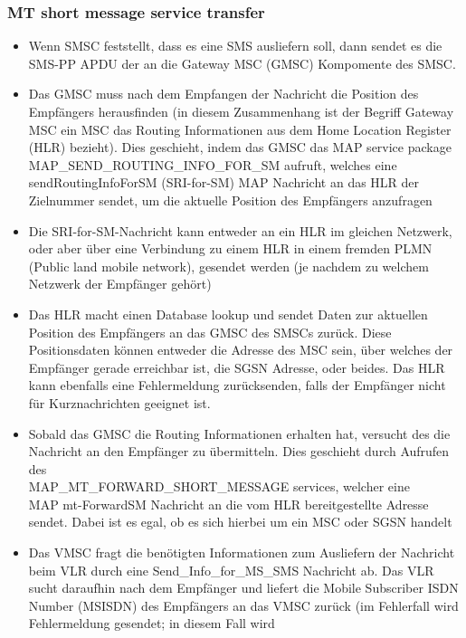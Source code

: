 \documentclass[german,12pt,a4paper]{article}
\begin{document}
\subsubsection{MT short message service transfer}
\begin{itemize}
	\item Wenn SMSC feststellt, dass es eine SMS ausliefern soll, dann sendet es die 
		SMS-PP APDU der an die Gateway MSC (GMSC) Kompomente des SMSC.
	\item Das GMSC muss nach dem Empfangen der Nachricht die Position des Empfängers 
		herausfinden (in diesem Zusammenhang ist der Begriff Gateway MSC ein MSC das 
		Routing Informationen aus dem Home Location Register (HLR) bezieht). 
		Dies geschieht, indem das GMSC das MAP service package \\
		MAP\_SEND\_ROUTING\_INFO\_FOR\_SM aufruft, welches eine \\ sendRoutingInfoForSM 
		(SRI-for-SM) MAP Nachricht an das HLR der Zielnummer sendet, um die 
		aktuelle Position des Empfängers anzufragen
	\item Die SRI-for-SM-Nachricht kann entweder an ein HLR im gleichen Netzwerk, oder 
		aber über eine Verbindung zu einem HLR in einem fremden PLMN (Public land mobile 
		network), gesendet werden (je nachdem zu welchem Netzwerk der Empfänger gehört)
	\item Das HLR macht einen Database lookup und sendet Daten zur aktuellen Position des 
		Empfängers an das GMSC des SMSCs zurück. Diese Positionsdaten können entweder die 
		Adresse des MSC sein, über welches der Empfänger gerade erreichbar ist, die 
		SGSN Adresse, oder beides. Das HLR kann ebenfalls eine Fehlermeldung zurücksenden, 
		falls der Empfänger nicht für Kurznachrichten geeignet ist.
	\item Sobald das GMSC die Routing Informationen erhalten hat, versucht des die 
		Nachricht an den Empfänger zu übermitteln. Dies geschieht durch Aufrufen des \\
		MAP\_MT\_FORWARD\_SHORT\_MESSAGE services, welcher eine \\ 
		MAP mt-ForwardSM Nachricht 
		an die vom HLR bereitgestellte Adresse sendet. Dabei ist es egal, ob es 
		sich hierbei um ein MSC oder SGSN handelt
	\item Das VMSC fragt die benötigten Informationen zum Ausliefern der Nachricht beim VLR 
		durch eine Send\_Info\_for\_MS\_SMS Nachricht ab. Das VLR sucht daraufhin nach dem 
		Empfänger und liefert die Mobile Subscriber ISDN Number (MSISDN) des Empfängers an 
		das VMSC zurück (im Fehlerfall wird Fehlermeldung gesendet; in diesem Fall wird 

\end{itemize}
\end{document}
